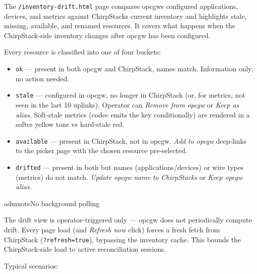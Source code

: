 The \texttt{/inventory-drift.html} page compares opcgw\textquotesingle s configured applications, devices, and metrics against ChirpStack\textquotesingle s current inventory and highlights stale, missing, available, and renamed resources. It covers what happens when the ChirpStack-side inventory changes after opcgw has been configured.

Every resource is classified into one of four buckets:

\begin{itemize}
\item
  \texttt{ok} --- present in both opcgw and ChirpStack, names match. Information only; no action needed.
\item
  \texttt{stale} --- configured in opcgw, no longer in ChirpStack (or, for metrics, not seen in the last 10 uplinks). Operator can \emph{Remove from opcgw} or \emph{Keep as alias}. Soft-stale metrics (codec emits the key conditionally) are rendered in a softer yellow tone vs hard-stale red.
\item
  \texttt{available} --- present in ChirpStack, not in opcgw. \emph{Add to opcgw} deep-links to the picker page with the chosen resource pre-selected.
\item
  \texttt{drifted} --- present in both but names (applications/devices) or wire types (metrics) do not match. \emph{Update opcgw name to ChirpStack\textquotesingle s} or \emph{Keep opcgw alias}.
\end{itemize}

\begin{admonition}{admnote}{No background polling}

The drift view is operator-triggered only --- opcgw does not periodically compute drift. Every page load (and \emph{Refresh now} click) forces a fresh fetch from ChirpStack (\texttt{?refresh=true}), bypassing the inventory cache. This bounds the ChirpStack-side load to active reconciliation sessions.

\end{admonition}

Typical scenarios:

